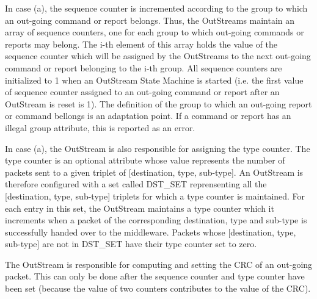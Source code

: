 In case (a), the sequence counter is incremented according to the group to which an out-going command or report belongs. Thus, the OutStreams maintain an array of sequence counters, one for each group to which out-going commands or reports may belong. The i-th element of this array holds the value of the sequence counter which will be assigned by the OutStreams to the next out-going command or report belonging to the i-th group. All sequence counters are initialized to 1 when an OutStream State Machine is started (i.e. the first value of sequence counter assigned to an out-going command or report after an OutStream is reset is 1). The definition of the group to which an out-going report or command bellongs is an adaptation point. If a command or report has an illegal group attribute, this is reported as an error.

In case (a), the OutStream is also responsible for assigning the type counter. The type counter is an optional attribute whose value represents the number of packets sent to a given triplet of [destination, type, sub-type]. An OutStream is therefore configured with a set called DST\_SET reprensenting all the [destination, type, sub-type] triplets for which a type counter is maintained. For each entry in this set, the OutStream maintains a type counter which it increments when a packet of the corresponding destination, type and sub-type is successfully handed over to the middleware. Packets whose [destination, type, sub-type] are not in DST\_SET have their type counter set to zero.

The OutStream is responsible for computing and setting the CRC of an out-going packet. This can only be done after the sequence counter and type counter have been set (because the value of two counters contributes to the value of the CRC).
 
